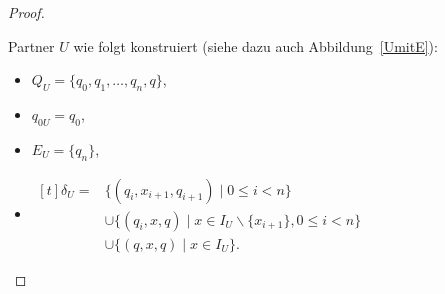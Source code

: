 \begin{proof}
\begin{itemize}
      Partner $U$ wie folgt konstruiert (siehe dazu auch Abbildung~\ref{UmitE}):
      \begin{itemize}
        \item $Q_U=\{q_0,q_1,\dots ,q_n,q\}$,
        \item $q_{0U}=q_0$,
        \item $E_U=\{q_n\}$,
        \item $\begin{aligned}[t]
            \delta _U=&\{(q_i,x_{i+1},q_{i+1})\mid 0\leq i< n\}\\
                      &\cup\{(q_i,x,q)\mid x\in I_U\backslash\{x_{i+1}\},0\leq
          i< n\}\\
          &\cup\{(q,x,q)\mid x\in I_U\}.
              \end{aligned}$
      \end{itemize}
      \begin{figure} [h!tbp]
      \begin{center}
\end{center}
\end{figure}
\end{itemize}
\end{proof}
